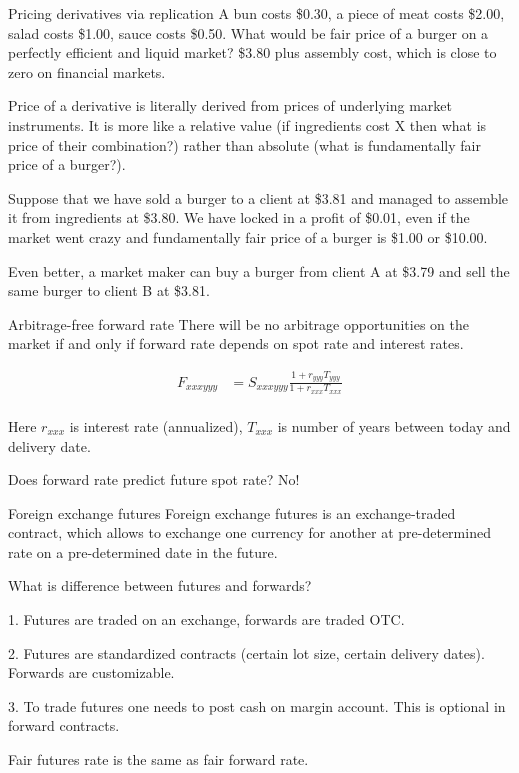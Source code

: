 \documentclass{beamer}
\begin{document}
\begin{frame}{Pricing derivatives via replication}
\justify
A bun costs \$0.30, a piece of meat costs \$2.00, salad costs \$1.00, sauce costs \$0.50. What would be fair price of a burger on a perfectly efficient and liquid market? \$3.80 plus assembly cost, which is close to zero on financial markets.

\justify
Price of a derivative is literally derived from prices of underlying market instruments. It is more like a relative value (if ingredients cost X then what is price of their combination?) rather than absolute (what is fundamentally fair price of a burger?).

\justify
Suppose that we have sold a burger to a client at \$3.81 and managed to assemble it from ingredients at \$3.80. We have locked in a profit of \$0.01, even if the market went crazy and fundamentally fair price of a burger is \$1.00 or \$10.00.

\justify
Even better, a market maker can buy a burger from client A at \$3.79 and sell the same burger to client B at \$3.81.
\end{frame}



\begin{frame}{Arbitrage-free forward rate}
\justify
There will be no arbitrage opportunities on the market if and only if forward rate depends on spot rate and interest rates.

\begin{align*}
F_{xxxyyy} &= S_{xxxyyy} \frac{1 + r_{yyy}T_{yyy}}{1 + r_{xxx}T_{xxx}} \\
\end{align*}

Here $r_{xxx}$ is interest rate (annualized), $T_{xxx}$ is number of years between today and delivery date.

\justify
Does forward rate predict future spot rate? No!
\end{frame}



\begin{frame}{Foreign exchange futures}
\justify
\alert{Foreign exchange futures} is an exchange-traded contract, which allows to exchange one currency for another at pre-determined rate on a pre-determined date in the future.

\justify
What is difference between futures and forwards?

1. Futures are traded on an exchange, forwards are traded OTC.

2. Futures are standardized contracts (certain lot size, certain delivery dates). Forwards are customizable.

3. To trade futures one needs to post cash on margin account. This is optional in forward contracts.


\justify
Fair futures rate is the same as fair forward rate.
\end{frame}
\end{document}
